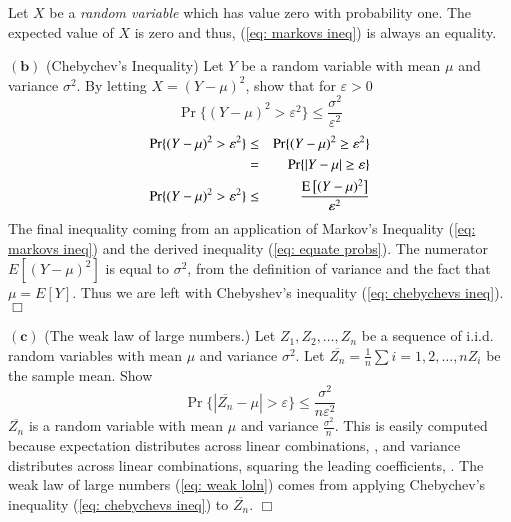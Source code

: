 \documentclass[10pt]{article}
\DeclareMathOperator*{\E}{\mbox{\text{E}}}
\newcommand{\pref}[1]{{(\ref{#1})}}
\begin{document}
\begin{tiny}
\begin{multicols}{3}
Let $X$ be a \emph{random variable} which has value zero with probability
one.
The expected value of $X$ is zero and thus, 
\pref{eq: markovs ineq} is always an equality.

$\mathbf{(b)}$
(Chebychev's Inequality) Let $Y$ be a random variable with mean $\mu$ and
variance $\sigma^2$. By letting $X = (Y-\mu)^2$, show that for
$\varepsilon > 0$
\begin{equation}
    \Pr \{(Y-\mu)^2 > \varepsilon^2\} \leq \frac{\sigma^2}{\varepsilon^2}
    \label{eq: chebychevs ineq}
\end{equation}
\proof
\begin{eqnarray}
    \Pr\{(Y-\mu)^2 > \varepsilon^2\} &\leq& \Pr\{(Y-\mu)^2 \geq \varepsilon^2\}
        \nonumber \\
        &=& \Pr\{|Y-\mu| \geq \varepsilon\}
        \label{eq: equate probs} \\
    \Pr \{(Y-\mu)^2 > \varepsilon^2\} &\leq& \frac{\E \big[(Y-\mu)^2\big]}{\varepsilon^2}
        \label{eq:instatiate 3.1a}
\end{eqnarray}
The final inequality coming from an application of Markov's Inequality
\pref{eq: markovs ineq} and the derived inequality \pref{eq: equate probs}.
The numerator $E[(Y-\mu)^2]$ is equal to $\sigma^2$, from the definition
of variance and the fact that $\mu = E[Y]$. Thus we are left with
Chebyshev's inequality \pref{eq: chebychevs ineq}. $\Box$

$\mathbf{(c)}$
(The weak law of large numbers.) Let $Z_1,Z_2,\dots,Z_n$ be a sequence of
i.i.d. random variables with mean $\mu$ and variance $\sigma^2$. Let
$\overline{Z_n} = \frac{1}{n}\sum{i=1,2,\dots,n}Z_i$ be the sample mean.
Show 
\begin{equation}
    \Pr \{|\overline{Z_n} - \mu| > \varepsilon\} \leq
    \frac{\sigma^2}{n\varepsilon^2}
    \label{eq: weak loln}
\end{equation}
\proof
$\overline{Z_n}$ is a random variable with mean $\mu$ and variance
$\frac{\sigma^2}{n}$. This is easily computed because expectation
distributes across linear combinations, 
, and variance distributes across linear combinations, squaring the
leading coefficients,
. The weak law of large numbers \pref{eq: weak loln} comes from applying
Chebychev's inequality \pref{eq: chebychevs ineq} to $\overline{Z_n}$.
$\Box$


\end{multicols}
\end{tiny}
\end{document}
